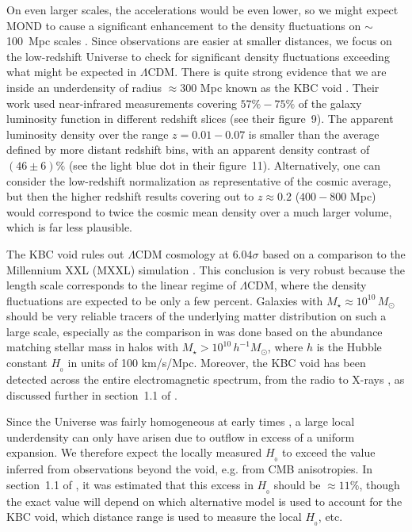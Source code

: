 \documentclass[fleqn,usenatbib,useAMS]{mnras} %
\begin{document}
On even larger scales, the accelerations would be even lower, so we might expect MOND to cause a significant enhancement to the density fluctuations on $\sim$100~Mpc scales \citep{Sanders_2001}. Since observations are easier at smaller distances, we focus on the low-redshift Universe to check for significant density fluctuations exceeding what might be expected in $\Lambda$CDM. There is quite strong evidence that we are inside an underdensity of radius $\approx 300$ Mpc known as the KBC void \citep*{Keenan_2013}. Their work used near-infrared measurements covering $57\%-75\%$ of the galaxy luminosity function in different redshift slices (see their figure~9). The apparent luminosity density over the range $z = 0.01-0.07$ is smaller than the average defined by more distant redshift bins, with an apparent density contrast of $\left( 46 \pm 6 \right)\%$ (see the light blue dot in their figure~11). Alternatively, one can consider the low-redshift normalization as representative of the cosmic average, but then the higher redshift results covering out to $z \approx 0.2$ ($400 - 800$ Mpc) would correspond to twice the cosmic mean density over a much larger volume, which is far less plausible.

The KBC void \citep[discussed also in][]{Wong_2022} rules out $\Lambda$CDM cosmology at $6.04 \sigma$ \citep{Haslbauer_2020} based on a comparison to the Millennium XXL (MXXL) simulation \citep{Angulo_2012}. This conclusion is very robust because the length scale corresponds to the linear regime of $\Lambda$CDM, where the density fluctuations are expected to be only a few percent. Galaxies with $M_{\star} \approx 10^{10} \, M_\odot$ should be very reliable tracers of the underlying matter distribution on such a large scale, especially as the comparison in \citet{Haslbauer_2020} was done based on the abundance matching \citep{Springel_2005, Angulo_2014} stellar mass in halos with $M_{\star} > 10^{10} \, h^{-1} M_\odot$, where $h$ is the Hubble constant $H_{_0}$ in units of 100 km/s/Mpc. Moreover, the KBC void has been detected across the entire electromagnetic spectrum, from the radio \citep{Rubart_2013} to X-rays \citep{Bohringer_2015, Bohringer_2020}, as discussed further in section~1.1 of \citet{Haslbauer_2020}.

Since the Universe was fairly homogeneous at early times \citep{Planck_2014_Doppler}, a large local underdensity can only have arisen due to outflow in excess of a uniform expansion. We therefore expect the locally measured $H_{_0}$ to exceed the value inferred from observations beyond the void, e.g. from CMB anisotropies. In section~1.1 of \citet{Haslbauer_2020}, it was estimated that this excess in $H_{_0}$ should be $\approx 11\%$, though the exact value will depend on which alternative model is used to account for the KBC void, which distance range is used to measure the local $H_{_0}$, etc.
\end{document}
